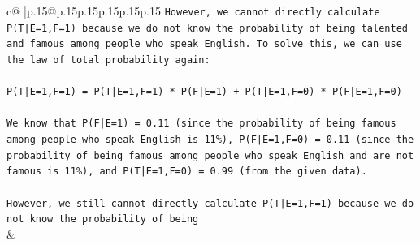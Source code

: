 \documentclass{article}
\begin{document}
{\begin{supertabular}{c@{$\;$}|p{.15\linewidth}@{}p{.15\linewidth}p{.15\linewidth}p{.15\linewidth}p{.15\linewidth}p{.15\linewidth}}
{{{\texttt{However, we cannot directly calculate P(T|E=1,F=1) because we do not know the probability of being talented and famous among people who speak English. To solve this, we can use the law of total probability again:} \\
\\ 
\texttt{P(T|E=1,F=1) = P(T|E=1,F=1) * P(F|E=1) + P(T|E=1,F=0) * P(F|E=1,F=0)} \\
\\ 
\texttt{We know that P(F|E=1) = 0.11 (since the probability of being famous among people who speak English is 11\%), P(F|E=1,F=0) = 0.11 (since the probability of being famous among people who speak English and are not famous is 11\%), and P(T|E=1,F=0) = 0.99 (from the given data).} \\
\\ 
\texttt{However, we still cannot directly calculate P(T|E=1,F=1) because we do not know the probability of being} \\
            }
        }
    }
    & \\ \\


\end{supertabular}}
\end{document}
